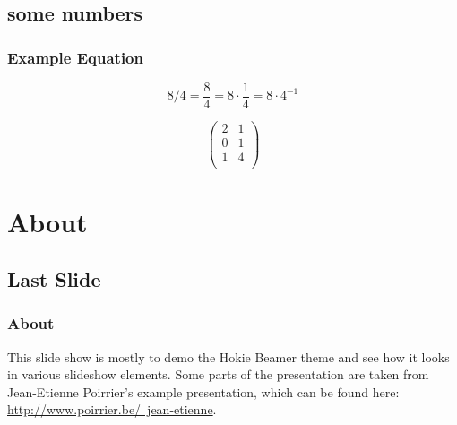 \documentclass{beamer}
\begin{document}
\subsection{some numbers}
\frame
{
	\frametitle{Example Equation}

	\[8 / 4 = \frac{8}{4} = 8 \cdot \frac{1}{4} = 8 \cdot 4^{-1}\]
	
	\[\left( \begin{array}{cc}
	2 & 1 \\
	0 & 1 \\
	1 & 4 \\
	\end{array} \right)\]
}

\section{About}
\subsection{Last Slide}

\frame
{
	\frametitle{About}

	This slide show is mostly to demo the Hokie Beamer theme and see how it looks in various slideshow elements.  Some parts of the presentation are taken from Jean-Etienne Poirrier's example presentation, which can be found here:  \href{http://www.poirrier.be/~jean-etienne}{http://www.poirrier.be/~jean-etienne}.
}
\end{document}

